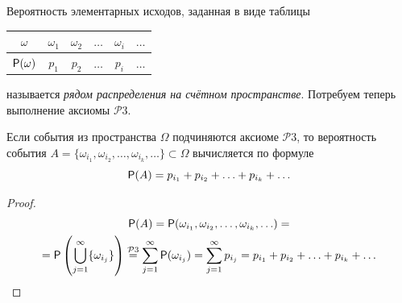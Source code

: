 \begin{definition}
	\label{def:4.12}
Вероятность элементарных исходов, заданная в виде таблицы
\begin{center}
	\begin{tabular}{|c|c|c|c|c|c|}
		\hline
		$\omega$ & $\omega_1$ & $\omega_2$ & $\ldots$ & $\omega_i$ & $\ldots$ \\ \hline
		$\P(\omega)$  & $p_1$ & $p_2$ & $\ldots$  & $p_i$ & $\ldots$ \\ \hline
	\end{tabular}
\end{center}
называется \textit{рядом распределения на счётном пространстве}.
Потребуем теперь выполнение аксиомы $\mathcal{P}3$.
\end{definition}

\begin{lemma}
	\label{lemma:4.13}
Если события из пространства $\Omega$ подчиняются аксиоме $\mathcal{P}3$, то вероятность события $A = \{\omega_{i_1} , \omega_{i_2} , \ldots , \omega_{i_k} , \ldots \} \subset \Omega$ вычисляется по формуле
$$\P (A) = p_{i_1} + p_{i_2} + \ldots + p_{i_k} + \ldots$$
\end{lemma}

\begin{proof}
\begin{gather*}
	\P(A) = \P(\omega_{i_1},\omega_{i_2}, \ldots, \omega_{i_k}, \ldots) =\\= \P \left( \bigcup_{j=1}^\infty \{ \omega_{i_j}\} \right) \stackrel{\mathcal{P}3}{=} \sum_{j=1}^{\infty} \P(\omega_{i_j}) = \sum_{j=1}^{\infty} p_{i_j} = p_{i_1} + p_{i_2} + \ldots + p_{i_k} + \ldots 
\end{gather*}
	
\end{proof}

